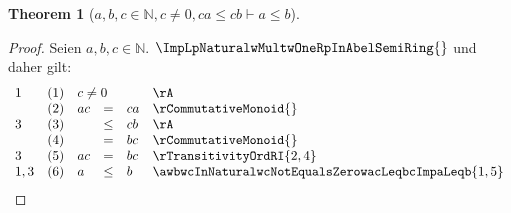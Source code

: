 \documentclass{book}
\theoremstyle{plain}
\newtheorem{theorem}{Theorem}
\theoremstyle{remark}
\theoremstyle{definition}
\begin{document}
\label{awbwcInNaturalwcNotEqualsZerowcaLeqcbImpaLeqb}
\begin{theorem}[\(a,b,c\in\mathbb{N},c\neq 0, ca\leq cb\vdash a\leq b\)]
\end{theorem}
\begin{proof}
Seien \(a,b,c\in\mathbb{N}\). \(\ImpLpNaturalwMultwOneRpInAbelSemiRing{}\) und daher gilt:
       \[
	\begin{array}{lllcll}
            1       &  (1)  & \multicolumn{3}{l}{c\neq 0} & \rA \\
                    &  (2)  & ac&=&ca & \rCommutativeMonoid{} \\
            3       &  (3)  & &\leq &cb & \rA \\
                    &  (4)  & &= &bc & \rCommutativeMonoid{} \\
            3       &  (5)  & ac&=&bc & \rTransitivityOrdRI{2,4} \\     
            1,3       &  (6)  & a&\leq &b & \awbwcInNaturalwcNotEqualsZerowacLeqbcImpaLeqb{1,5} \\ 
	\end{array}
        \]
\end{proof}
\end{document}
